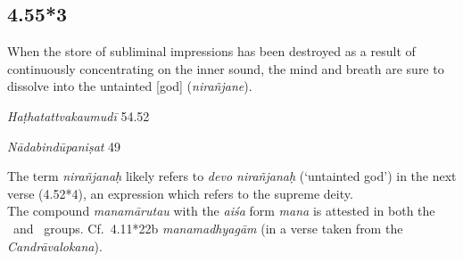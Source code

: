 \begin{ekdosis}

\subsection*{4.55*3}
\begin{translation}[hp04_055_3]
When the store of subliminal impressions has been destroyed as a result of continuously concentrating on the inner sound, the mind and breath are sure to dissolve into the untainted [god] (\emph{nirañjane}).
\end{translation}%
%


\begin{testimonia}[hp04_055_3]

\emph{Haṭhatattvakaumudī} 54.52
\begin{versinnote}
\end{versinnote}

\emph{Nādabindūpaniṣat} 49
\begin{versinnote}
\end{versinnote}
\end{testimonia}

\begin{philcomm}[hp04_055_3]
The term \emph{nirañjanaḥ} likely refers to \emph{devo nirañjanaḥ} (`untainted god') in the next verse (4.52*4), an expression which refers to the supreme deity.\\
The compound \emph{manamārutau} with the \emph{aiśa} form \emph{mana} is attested in both the \texteta\ and \textepsilon\ groups. Cf.~4.11*22b \emph{manamadhyagām} (in a verse taken from the \emph{Candrāvalokana}).
\end{philcomm}


\end{ekdosis}

